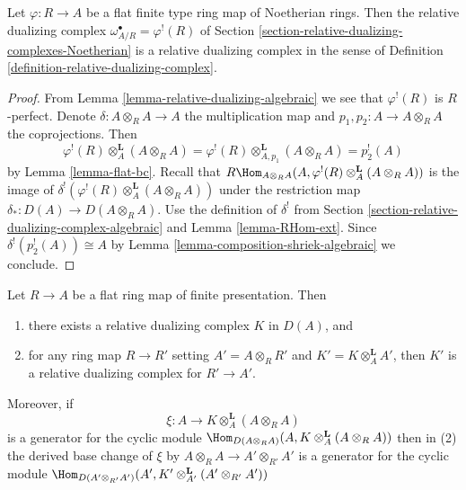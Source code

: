 \begin{lemma}
\label{lemma-relative-dualizing-noetherian}
Let $\varphi : R \to A$ be a flat finite type ring map of Noetherian rings.
Then the relative dualizing complex $\omega_{A/R}^\bullet = \varphi^!(R)$
of Section \ref{section-relative-dualizing-complexes-Noetherian}
is a relative dualizing complex in the sense of
Definition \ref{definition-relative-dualizing-complex}.
\end{lemma}

\begin{proof}
From Lemma \ref{lemma-relative-dualizing-algebraic} we see that
$\varphi^!(R)$ is $R$-perfect.
Denote $\delta : A \otimes_R A \to A$ the multiplication map
and $p_1, p_2 : A \to A \otimes_R A$ the coprojections.
Then
$$
\varphi^!(R) \otimes_A^\mathbf{L} (A \otimes_R A) =
\varphi^!(R) \otimes_{A, p_1}^\mathbf{L} (A \otimes_R A) =
p_2^!(A)
$$
by Lemma \ref{lemma-flat-bc}. Recall that
$
R\Hom_{A \otimes_R A}(A, \varphi^!(R) \otimes_A^\mathbf{L} (A \otimes_R A))
$
is the image of $\delta^!(\varphi^!(R) \otimes_A^\mathbf{L} (A \otimes_R A))$
under the restriction map $\delta_* : D(A) \to D(A \otimes_R A)$.
Use the definition of $\delta^!$ from
Section \ref{section-relative-dualizing-complex-algebraic}
and Lemma \ref{lemma-RHom-ext}.
Since $\delta^!(p_2^!(A)) \cong A$ by
Lemma \ref{lemma-composition-shriek-algebraic}
we conclude.
\end{proof}

\begin{lemma}
\label{lemma-base-change-relative-dualizing}
Let $R \to A$ be a flat ring map of finite presentation. Then
\begin{enumerate}
\item there exists a relative dualizing complex $K$ in $D(A)$, and
\item for any ring map $R \to R'$ setting $A' = A \otimes_R R'$
and $K' = K \otimes_A^\mathbf{L} A'$, then $K'$ is a
relative dualizing complex for $R' \to A'$.
\end{enumerate}
Moreover, if
$$
\xi : A \longrightarrow K \otimes_A^\mathbf{L} (A \otimes_R A)
$$
is a generator for the cyclic module
$\Hom_{D(A \otimes_R A)}(A, K \otimes_A^\mathbf{L} (A \otimes_R A))$
then in (2) the derived base change of $\xi$ by
$A \otimes_R A \to A' \otimes_{R'} A'$ is a generator for
the cyclic module
$\Hom_{D(A' \otimes_{R'} A')}(A',
K' \otimes_{A'}^\mathbf{L} (A' \otimes_{R'} A'))$
\end{lemma}

